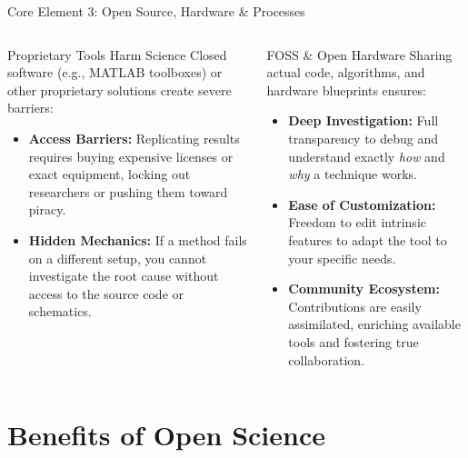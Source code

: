 \documentclass[aspectratio=169]{beamer}
\begin{document}
\begin{frame}{Core Element 3: Open Source, Hardware \& Processes}
  \begin{columns}[T,onlytextwidth]
      \vspace{.5em}
      
      \begin{alertblock}{Proprietary Tools Harm Science}
        Closed software (e.g., MATLAB toolboxes) or other proprietary solutions create severe barriers:
        \vspace{0.5em}
        \begin{itemize}
          \item \textbf{Access Barriers:} Replicating results requires buying expensive licenses or exact equipment, locking out researchers or pushing them toward piracy.
          \item \textbf{Hidden Mechanics:} If a method fails on a different setup, you cannot investigate the root cause without access to the source code or schematics.
        \end{itemize}
      \end{alertblock}

      \vspace{.5em}
      
      \begin{block}{FOSS \& Open Hardware}
        Sharing actual code, algorithms, and hardware blueprints ensures:
        \vspace{0.5em}
        \begin{itemize}
          \item \textbf{Deep Investigation:} Full transparency to debug and understand exactly \textit{how} and \textit{why} a technique works.
          \item \textbf{Ease of Customization:} Freedom to edit intrinsic features to adapt the tool to your specific needs.
          \item \textbf{Community Ecosystem:} Contributions are easily assimilated, enriching available tools and fostering true collaboration.
        \end{itemize}
      \end{block}
  \end{columns}
\end{frame}

\section{Benefits of Open Science}
\end{document}
